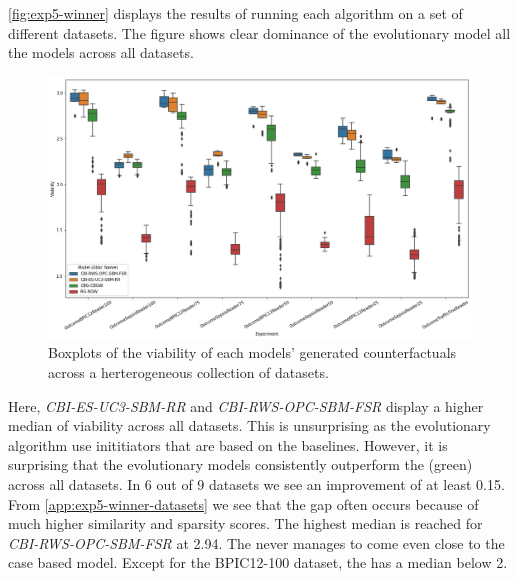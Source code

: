 \documentclass[./../../paper.tex]{subfiles}
\begin{document}
\autoref{fig:exp5-winner} displays the results of running each algorithm on a set of different datasets. The figure shows clear dominance of the evolutionary model all the models across all datasets. 

\begin{figure}[htbp]
    \centering
    \includegraphics[width=\textwidth]{figures/generated/exp5_winner_overall.png}
    \caption{Boxplots of the viability of each models' generated counterfactuals across a herterogeneous collection of datasets.}
    \label{fig:exp5-winner}
\end{figure}

Here, \emph{CBI-ES-UC3-SBM-RR} and \emph{CBI-RWS-OPC-SBM-FSR} display a higher median of viability across all datasets. 
This is unsurprising as the evolutionary algorithm use inititiators that are based on the baselines. 
However, it is surprising that the evolutionary models consistently outperform the \ModelCBG (green) across all datasets. In 6 out of 9 datasets we see an improvement of at least 0.15. 
From \autoref{app:exp5-winner-datasets} we see that the gap often occurs because of much higher similarity and sparsity scores. The highest median is reached for \emph{CBI-RWS-OPC-SBM-FSR} at 2.94. 
The \ModelRNG never manages to come even close to the case based model. Except for the BPIC12-100 dataset, the \ModelRNG has a median below 2. 
\end{document}
